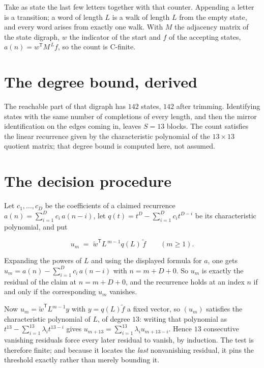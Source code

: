 \documentclass[11pt]{article}
\theoremstyle{definition}
\begin{document}
Take as state the last few letters together with that counter. Appending a letter is a transition; a word of length $L$ is a walk of length $L$ from the empty state, and every word arises from exactly one walk. With $M$ the adjacency matrix of the state digraph, $w$ the indicator of the start and $f$ of the accepting states, $a(n) = w^{\mathsf T}M^{\,L}f$, so the count is C-finite.

\section{The degree bound, derived}

The reachable part of that digraph has $142$ states, $142$ after trimming. Identifying states with the same number of completions of every length, and then the mirror identification on the edges coming in, leaves $S = 13$ blocks. The count satisfies the linear recurrence given by the characteristic polynomial of the $13\times13$ quotient matrix; that degree bound is computed here, not assumed.

\section{The decision procedure}

Let $c_1,\dots,c_D$ be the coefficients of a claimed recurrence $a(n) = \sum_{i=1}^{D} c_i\,a(n-i)$, let $q(t) = t^{D} - \sum_{i=1}^{D} c_i t^{D-i}$ be its characteristic polynomial, and put

\[u_m \;=\; \tilde w^{\mathsf T} L^{\,m-1} q(L)\,\tilde f \qquad (m \ge 1).\]

Expanding the powers of $L$ and using the displayed formula for $a$, one gets $u_m = a(n) - \sum_{i=1}^{D} c_i\,a(n-i)$ with $n = m + D + 0$. So $u_m$ is exactly the residual of the claim at $n = m + D + 0$, and the recurrence holds at an index $n$ if and only if the corresponding $u_m$ vanishes.

Now $u_m = \tilde w^{\mathsf T} L^{m-1} y$ with $y = q(L)\tilde f$ a fixed vector, so $(u_m)$ satisfies the characteristic polynomial of $L$, of degree $13$: writing that polynomial as $t^{13} - \sum_{i=1}^{13} \lambda_i t^{13-i}$ gives $u_{m+13} = \sum_{i=1}^{13} \lambda_i u_{m+13-i}$. Hence $13$ consecutive vanishing residuals force every later residual to vanish, by induction. The test is therefore finite; and because it locates the {\itshape last} nonvanishing residual, it pins the threshold exactly rather than merely bounding it.
\end{document}

